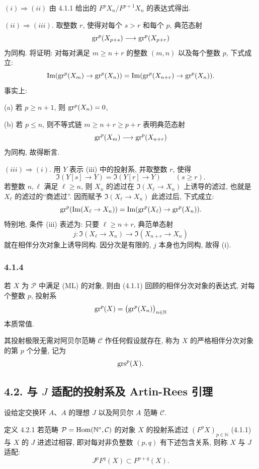 \begin{prooftext}[证明]
$(i)\Rightarrow(ii)$ 由 4.1.1 给出的 $F^pX_n/F^{p+1}X_n$ 的表达式得出.

$(ii)\Rightarrow(iii)$. 取整数 $r$, 使得对每个 $s>r$ 和每个 $p$, 典范态射
\[
\operatorname{gr}^p(X_{p+s})\longrightarrow \operatorname{gr}^p(X_{p+r})
\]
为同构. 将证明: 对每对满足 $m\ge n+r$ 的整数 $(m,n)$ 以及每个整数 $p$, 下式成立:
\[
\operatorname{Im}(\operatorname{gr}^p(X_m)\to\operatorname{gr}^p(X_n))=
\operatorname{Im}(\operatorname{gr}^p(X_{n+r})\to\operatorname{gr}^p(X_n)).
\]
事实上:

(a) 若 $p\ge n+1$, 则 $\operatorname{gr}^p(X_n)=0$,

(b) 若 $p\le n$, 则不等式链 $m\ge n+r\ge p+r$ 表明典范态射
\[
\operatorname{gr}^p(X_m)\longrightarrow\operatorname{gr}^p(X_{n+r})
\]
为同构, 故得断言.

$(iii)\Rightarrow(i)$. 用 $Y$ 表示 (iii) 中的投射系, 并取整数 $r$, 使得
\[
\Im(Y[s]\to Y)=\Im(Y[r]\to Y)\qquad(s\ge r).
\]
若整数 $n,\ell$ 满足 $\ell\ge n$, 则 $X_n$ 的滤过在 $\Im(X_\ell\to X_n)$ 上诱导的滤过, 也就是 $X_\ell$ 的滤过的``商滤过''. 因而赋予 $\Im(X_\ell\to X_n)$ 此滤过后, 下式成立:
\[
\operatorname{gr}^p(\operatorname{Im}(X_\ell\to X_n))=
\operatorname{Im}(\operatorname{gr}^p(X_\ell)\to\operatorname{gr}^p(X_n)).
\]
特别地, 条件 (iii) 表述为: 只要 $\ell\ge n+r$, 典范单态射
\[
j:\Im(X_\ell\to X_n)\longrightarrow\Im(X_{n+r}\to X_n)
\]
就在相伴分次对象上诱导同构. 因分次是有限的, $j$ 本身也为同构, 故得 (i).
\end{prooftext}


\subsubsection*{4.1.4}
若 \(X\) 为 \(\mathcal P\) 中满足 (ML) 的对象, 则由 (4.1.1) 回顾的相伴分次对象的表达式, 对每个整数 \(p\), 投射系
\[
\operatorname{gr}^p(X)=\bigl(\operatorname{gr}^p(X_n)\bigr)_{n\in\mathbb N}
\]
本质常值.

其投射极限无需对阿贝尔范畴 \(\mathcal C\) 作任何假设就存在, 称为 \(X\) 的严格相伴分次对象的第 \(p\) 个分量, 记为
\[
\operatorname{grs}^p(X).
\]

\subsection*{4.2. 与 \(J\) 适配的投射系及 Artin-Rees 引理}

设给定交换环 \(A\)、\(A\) 的理想 \(J\) 以及阿贝尔 \(A\) 范畴 \(\mathcal C\).

\begin{statement}{定义 4.2.1}
若范畴 \(\mathcal P=\operatorname{Hom}(\mathbb N^\circ,\mathcal C)\) 的对象 \(X\) 的投射系滤过 \((F^pX)_{p\in\mathbb N}\) (4.1.1) 与 \(X\) 的 \(J\) 进滤过相容, 即对每对非负整数 \((p,q)\) 有下述包含关系, 则称 \(X\) 与 \(J\) 适配:
\[
J^pF^q(X)\subset F^{p+q}(X).
\]
\end{statement}

